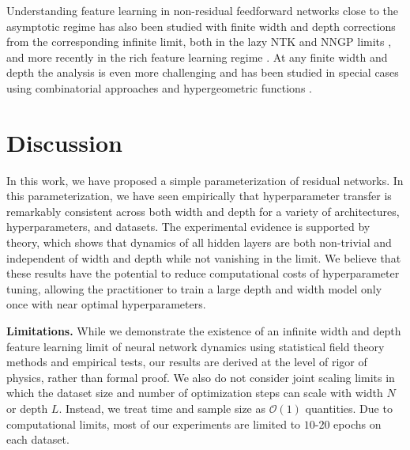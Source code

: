 \documentclass{article} %
\newcommand{\bb}[1]{{\color{red}[BB: #1]}}
\begin{document}
Understanding feature learning in non-residual feedforward networks close to the asymptotic regime has also been studied with finite width and depth corrections from the corresponding infinite limit, both in the lazy \citep{chizat2019lazy} NTK \citep{hanin2018neural, hanin2019finite} and NNGP limits \citep{antognini2019finite,  yaida2020non, li2021statistical, zavatone2021asymptotics, segadlo2022unified, hanin2022correlation}, and more recently in the rich feature learning regime \citep{bordelon2023dynamics}. At any finite width and depth the analysis is even more challenging and has been studied in special cases using combinatorial approaches and hypergeometric functions \citep{noci2021precise, zavatone2021exact, hanin2023bayesian}.



\section{Discussion}
\label{sec:discussion}
% 
In this work, we have proposed a simple parameterization of residual networks. In this parameterization, we have seen empirically that hyperparameter transfer is remarkably consistent across both width and depth for a variety of architectures, hyperparameters, and datasets.
%
The experimental evidence is supported by theory, which shows that dynamics of all hidden layers are both non-trivial and independent of width and depth while not vanishing in the limit. 
% 
We believe that these results have the potential to reduce computational costs of hyperparameter tuning, allowing the practitioner to train a large depth and width model only once with near optimal hyperparameters.

\textbf{Limitations.} While we demonstrate the existence of an infinite width and depth feature learning limit of neural network dynamics using statistical field theory methods and empirical tests, our results are derived at the level of rigor of physics, rather than formal proof. We also do not consider joint scaling limits in which the dataset size and number of optimization steps can scale with width $N$ or depth $L$. Instead, we treat time and sample size as $\mathcal{O}(1)$ quantities. Due to computational limits, most of our experiments are limited to $10$-$20$ epochs on each dataset.
\end{document}
